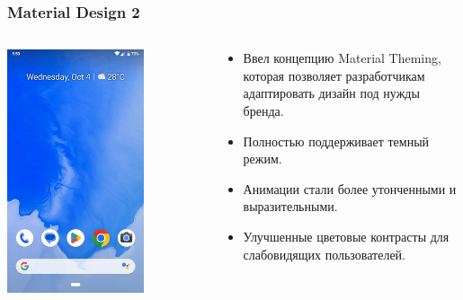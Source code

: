 \documentclass[12pt]{beamer}
\begin{document}
    \begin{frame}
        \frametitle{Material Design 2}
        \begin{columns}
            \begin{column}{0.5\textwidth}
                \includegraphics[width=0.7\textwidth]{android-9-0.png}
            \end{column}
            \begin{column}{0.5\textwidth}
                \begin{itemize}
                    \item Ввел концепцию Material Theming, которая позволяет разработчикам адаптировать дизайн под нужды бренда.
                    \item Полностью поддерживает темный режим.
                    \item Анимации стали более утонченными и выразительными.
                    \item Улучшенные цветовые контрасты для слабовидящих пользователей.
                \end{itemize}
            \end{column}
        \end{columns}
    \end{frame}
\end{document}

